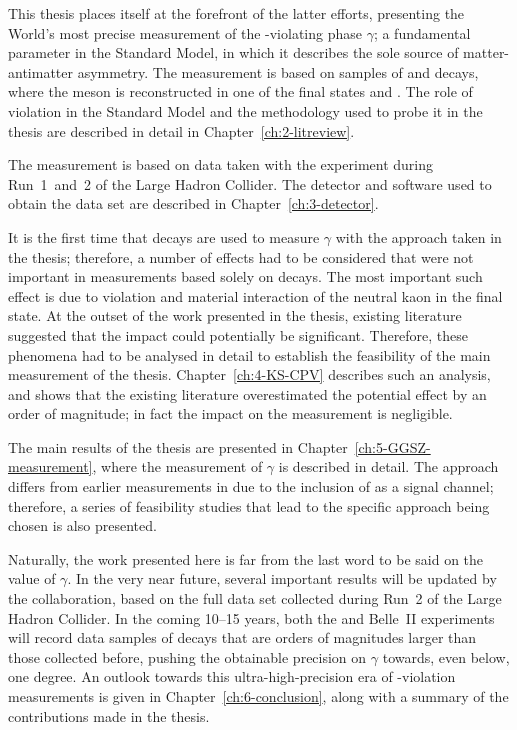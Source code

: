 This thesis places itself at the forefront of the latter efforts, presenting the World's most precise measurement of the \CP-violating phase $\gamma$; a fundamental parameter in the Standard Model, in which it describes the sole source of matter-antimatter asymmetry. The measurement is based on samples of \BtoDK and \BtoDpi decays, where the \D meson is reconstructed in one of the final states \Kspipi and \KsKK. The role of \CP violation in the Standard Model and the methodology used to probe it in the thesis are described in detail in Chapter~\ref{ch:2-litreview}.

The measurement is based on data taken with the \lhcb experiment during Run~1~and~2 of the Large Hadron Collider. The detector and software used to obtain the data set are described in Chapter~\ref{ch:3-detector}.

It is the first time that \BtoDpi decays are used to measure $\gamma$ with the approach taken in the thesis; therefore, a number of effects had to be considered that were not important in measurements based solely on \BtoDK decays. The most important such effect is due to \CP violation and material interaction of the neutral kaon in the final state. At the outset of the work presented in the thesis, existing literature suggested that the impact could potentially be significant. Therefore, these phenomena had to be analysed in detail to establish the feasibility of the main measurement of the thesis. Chapter~\ref{ch:4-KS-CPV} describes such an analysis, and shows that the existing literature overestimated the potential effect by an order of magnitude; in fact the impact on the measurement is negligible.

The main results of the thesis are presented in Chapter~\ref{ch:5-GGSZ-measurement}, where the measurement of $\gamma$ is described in detail. The approach differs from earlier measurements in \lhcb due to the inclusion of \BtoDpi as a signal channel; therefore, a series of feasibility studies that lead to the specific approach being chosen is also presented.


Naturally, the work presented here is far from the last word to be said on the value of $\gamma$. In the very near future, several important results will be updated by the \lhcb collaboration, based on the full data set collected during Run~2 of the Large Hadron Collider. In the coming 10--15 years, both the \lhcb and Belle~II experiments will record data samples of \B decays that are orders of magnitudes larger than those collected before, pushing the obtainable precision on $\gamma$ towards, even below, one degree. An outlook towards this ultra-high-precision era of \CP-violation measurements is given in Chapter~\ref{ch:6-conclusion}, along with a summary of the contributions made in the thesis.



